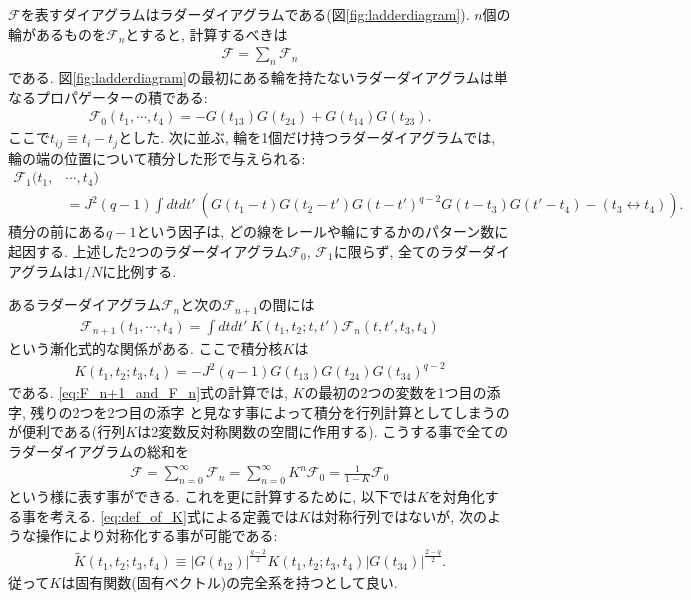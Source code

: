 $\mathcal{F}$を表すダイアグラムはラダーダイアグラムである(図\ref{fig:ladderdiagram}). 
$n$個の輪があるものを$\mathcal{F}_n$とすると, 計算するべきは
\begin{align}
	\mathcal{F} = \sum_n \mathcal{F}_n
\end{align}
である. 
図\ref{fig:ladderdiagram}の最初にある輪を持たないラダーダイアグラムは単なるプロパゲーターの積である:
\begin{align}
	\mathcal{F}_0(t_1, \cdots, t_4) = -G(t_{13})G(t_{24}) + G(t_{14})G(t_{23}).
\end{align}
ここで$t_{ij} \equiv t_i - t_j$とした.
次に並ぶ, 輪を1個だけ持つラダーダイアグラムでは, 輪の端の位置について積分した形で与えられる:
\begin{align}
	\mathcal{F}_1(t_1, &\cdots, t_4)\nonumber\\
	&= J^2(q - 1)\int dtdt'\ \left(
		G(t_1 - t)G(t_2 - t')G(t - t')^{q-2}G(t - t_3)G(t' - t_4) - (t_3 \leftrightarrow t_4)
	\right).
\end{align}
積分の前にある$q-1$という因子は, どの線をレールや輪にするかのパターン数に起因する. 
上述した2つのラダーダイアグラム$\mathcal{F}_0$, $\mathcal{F}_1$に限らず, 
全てのラダーダイアグラムは$1/N$に比例する. 

あるラダーダイアグラム$\mathcal{F}_n$と次の$\mathcal{F}_{n+1}$の間には
\begin{align}
	\mathcal{F}_{n+1}(t_1, \cdots, t_4)
	= \int dtdt'\ K(t_1, t_2; t, t')\mathcal{F}_n(t, t', t_3, t_4)
	\label{eq:F_n+1_and_F_n}
\end{align}
という漸化式的な関係がある. 
ここで積分核$K$は
\begin{align}
	K(t_1, t_2; t_3, t_4) = -J^2(q-1)G(t_{13})G(t_{24})G(t_{34})^{q-2}
	\label{eq:def_of_K}
\end{align}
である. 
\eqref{eq:F_n+1_and_F_n}式の計算では, $K$の最初の2つの変数を1つ目の添字, 残りの2つを2つ目の添字
と見なす事によって積分を行列計算としてしまうのが便利である(行列$K$は2変数反対称関数の空間に作用する). 
こうする事で全てのラダーダイアグラムの総和を
\begin{align}
	\mathcal{F}
	= \sum_{n=0}^{\infty}\mathcal{F}_n
	= \sum_{n=0}^{\infty}K^n \mathcal{F}_0
	= \frac{1}{1 - K}\mathcal{F}_0
	\label{eq:geometric_series_of_F}
\end{align}
という様に表す事ができる. 
これを更に計算するために, 以下では$K$を対角化する事を考える. 
\eqref{eq:def_of_K}式による定義では$K$は対称行列ではないが, 
次のような操作により対称化する事が可能である:
\begin{align}
	\tilde{K}(t_1, t_2; t_3, t_4) \equiv
	|G(t_{12})|^{\frac{q-2}{2}}K(t_1, t_2; t_3, t_4)|G(t_{34})|^{\frac{2-q}{2}}.
	\label{eq:symmetric_K}
\end{align}
従って$K$は固有関数(固有ベクトル)の完全系を持つとして良い. 

